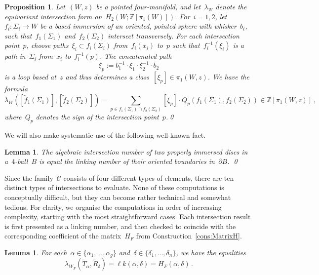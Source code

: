 \documentclass[10.9pt,a4paper]{amsart}
\newtheorem{lemma}[theorem]{Lemma}
\newtheorem{proposition}[theorem]{Proposition}
\theoremstyle{definition}
\theoremstyle{remark}
\newcommand{\Z}{\mathbb{Z}}
\newcommand{\lk}{\ell k}
\begin{document}
\begin{proposition}
\label{prop:FL1}
Let~$(W,z)$ be a pointed four-manifold, and let~$\lambda_W$ denote the equivariant intersection form on~$H_2(W;\Z[\pi_1(W)])$. For~$i = 1,2$, let~$f_i \colon \Sigma_i \to W$ be a based immersion of an oriented, pointed sphere
with whisker~$b_i$, such that~$f_1(\Sigma_1)$ and~$f_2(\Sigma_2)$ intersect transversely. For each intersection point~$p$, choose paths~$\xi_i \subset f_i(\Sigma_i)$ from~$f_i(x_i)$ to~$p$ such that~$f_i^{-1}(\xi_i)$ is a path in~$\Sigma_i$ from~$x_i$ to~$f_i^{-1}(p)$. The concatenated path
\[
\xi_p := b_1^{-1} \cdot \xi_1 \cdot \xi_2^{-1} \cdot b_2
\]
is a loop based at~$z$ and thus determines a class~$[\xi_p]\in\pi_1(W,z)$. We have the formula
\[
\lambda_W([\tilde f_1(\Sigma_1)], [\tilde f_2(\Sigma_2)]) = \sum_{p \in f_1(\Sigma_1) \cap f_2(\Sigma_2)} [\xi_p] \cdot Q_p(f_1(\Sigma_1), f_2(\Sigma_2)) \in \mathbb{Z}[\pi_1(W,z)]\,,
\]
where~$Q_p$ denotes the sign of the intersection point~$p$.\qed
\end{proposition}



We will also make systematic use of the following well-known fact.

\begin{lemma}
\label{lemma:AlgebraicIntersectionNumber}
The algebraic intersection number of two properly immersed discs in a~$4$-ball~$B$ is equal the linking number of their oriented boundaries in~$\partial B$.
\qed
\end{lemma}

Since the family~$\mathcal C$ consists of four different types of elements, there are ten distinct types of intersections to evaluate. None of these computations is conceptually difficult, but they can become rather technical and somewhat tedious.  
For clarity, we organise the computations in order of increasing complexity, starting with the most straightforward cases. Each intersection result is first presented as a linking number, and then checked to coincide with the corresponding
coefficient of the matrix~$H_F$ from Construction~\ref{cons:MatrixH}. 






\begin{lemma}
\label{lemma:IntTR}
For each~$\alpha\in\{\alpha_1,\dots,\alpha_g\}$ and~$\delta\in\{\delta_1,\dots,\delta_n\}$, we have the equalities
\[
\lambda_{W_F}(\tilde T_{\alpha},\tilde R_{\delta}) = \lk(\alpha, \delta) =  H_F(\alpha, \delta)\,.
\]
\end{lemma}
\end{document}
